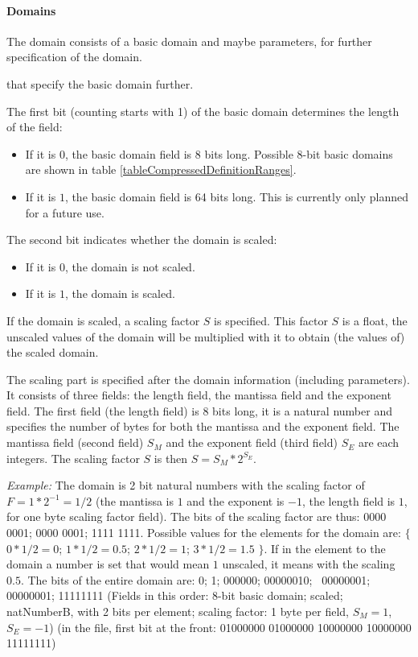 \paragraph{Domains}
\label{secCompressedDefinitionrangesArea}\label{parCompressedDomains}

The domain consists of a basic domain and maybe parameters, for further specification of the domain.

that specify the basic domain further.

\bigskip\noindent
The first bit (counting starts with 1) of the basic domain determines the length of the field:
\begin{itemize}
 \item If it is $0$, the basic domain field is 8 bits long. Possible 8-bit basic domains are shown in table \ref{tableCompressedDefinitionRanges}.
 \item If it is $1$, the basic domain field is 64 bits long. This is currently only planned for a future use.
\end{itemize}

\bigskip\noindent
The second bit indicates whether the domain is scaled:
\begin{itemize}
 \item If it is $0$, the domain is not scaled.
 \item If it is $1$, the domain is scaled.
\end{itemize}

If the domain is scaled, a scaling factor $S$ is specified. This factor $S$ is a float, the unscaled values of the domain will be multiplied with it to obtain (the values of) the scaled domain.

The scaling part is specified after the domain information (including parameters). It consists of three fields: the length field, the mantissa field and the exponent field. The first field (the length field) is 8 bits long, it is a natural number and specifies the number of bytes for both the mantissa and the exponent field. The mantissa field (second field) $S_M$ and the exponent field (third field) $S_E$ are each integers. The scaling factor $S$ is then $S=S_M*2^{S_E}$.

\noindent
\textit{Example:} The domain is 2 bit natural numbers with the scaling factor of $F=1*2^{-1}=1/2$ (the mantissa is $1$ and the exponent is $-1$, the length field is $1$, for one byte scaling factor field). The bits of the scaling factor are thus: 0000 0001; 0000 0001; 1111 1111. Possible values for the elements for the domain are: $\{$ $0*1/2=0$; $1*1/2=0.5$; $2*1/2=1$; $3*1/2=1.5$ $\}$. If in the element to the domain a number is set that would mean $1$ unscaled, it means with the scaling $0.5$.
The bits of the entire domain are: 0; 1; 000000; 00000010; \ 00000001; 00000001; 11111111 (Fields in this order: 8-bit basic domain; scaled; natNumberB, with 2 bits per element; scaling factor: 1 byte per field, $S_M=1$, $S_E=-1$) (in the file, first bit at the front: 01000000 01000000 10000000 10000000 11111111)

